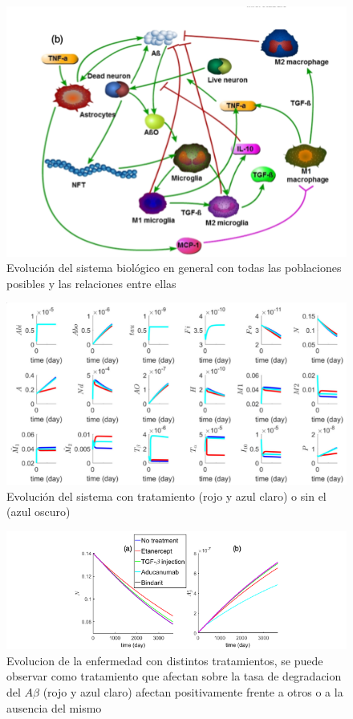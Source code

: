 \documentclass[1p]{elsarticle}
\begin{document}
	\begin{figure}
		\includegraphics[scale=0.7]{segundodiagrama.png}
		\caption{Evolución del sistema biológico en general con todas las poblaciones posibles y las relaciones entre ellas }
		\label{cerebro13}
	\end{figure}

	\begin{figure}
		\includegraphics[scale=0.5]{cuarto.png}
		\caption{Evolución del sistema con tratamiento (rojo y azul claro) o sin el (azul oscuro)}
		\label{cerebro17}
	\end{figure}

	\begin{figure}
		\includegraphics[scale=0.7]{quinto.png}
		\caption{Evolucion de la enfermedad con distintos tratamientos, se puede observar como tratamiento que afectan sobre la tasa de degradacion del $A\beta$ (rojo y azul claro) afectan positivamente frente a otros o a la ausencia del mismo}
		\label{cerebro21}
	\end{figure}
\end{document}
